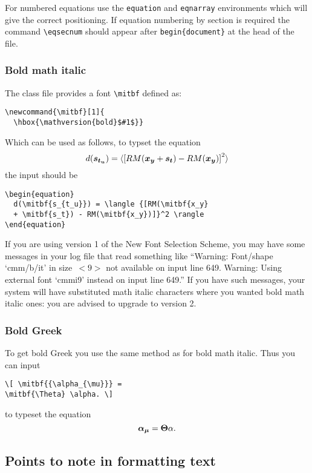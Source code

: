 For numbered equations use the \verb"equation" and \verb"eqnarray" environments
which will give the correct positioning. If equation numbering by section is
required the command \verb"\eqsecnum" should appear after \verb"begin{document}"
at the head of the file.

\subsubsection{Bold math italic}\label{boldmathitalic}

The class file provides a font \verb"\mitbf" defined as:
\begin{verbatim}
\newcommand{\mitbf}[1]{
  \hbox{\mathversion{bold}$#1$}}
\end{verbatim}
Which can be used as follows, to typset the equation
\begin{equation}
  d(\mitbf{s_{t_u}}) = \langle {[RM(\mitbf{x_y} + \mitbf{s_t}) - RM(\mitbf{x_y})]}^2 \rangle
\end{equation}
the input should be
\begin{verbatim}
\begin{equation}
  d(\mitbf{s_{t_u}}) = \langle {[RM(\mitbf{x_y}
  + \mitbf{s_t}) - RM(\mitbf{x_y})]}^2 \rangle
\end{equation}
\end{verbatim}

If you are using version 1 of the New Font Selection Scheme, you may have some
messages in your log file that read something like ``Warning: Font/shape
`cmm/b/it' in size~\hbox{$< \!\! 9 \!\! >$} not available on input line 649.
Warning: Using external font `cmmi9' instead on input line 649.'' If you have
such messages, your system will have substituted math italic characters where
you wanted bold math italic ones: you are advised to upgrade to version 2.


\subsubsection{Bold Greek}\label{boldgreek}

To get bold Greek you use the same method as for bold math italic. Thus you can
input
\begin{verbatim}
\[ \mitbf{{\alpha_{\mu}}} =
\mitbf{\Theta} \alpha. \]
\end{verbatim}
to typeset the equation \[ \mitbf{{\alpha_{\mu}}} = \mitbf{\Theta} \alpha. \]


\subsection{Points to note in formatting text}\label{formtext}

